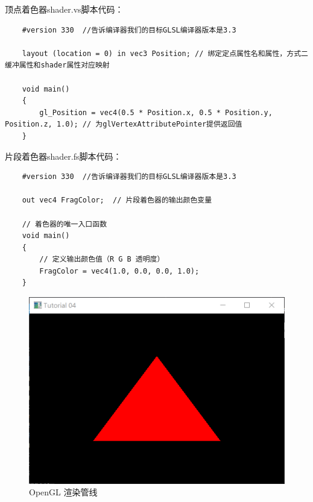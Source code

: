 \documentclass[UTF8,a4paper,8pt]{ctexbook}
\begin{document}
		顶点着色器shader.vs脚本代码：
		\begin{lstlisting}
	#version 330  //告诉编译器我们的目标GLSL编译器版本是3.3
	
	layout (location = 0) in vec3 Position; // 绑定定点属性名和属性，方式二缓冲属性和shader属性对应映射
	
	void main()
	{
		gl_Position = vec4(0.5 * Position.x, 0.5 * Position.y, Position.z, 1.0); // 为glVertexAttributePointer提供返回值
	}		
		\end{lstlisting}
		
		片段着色器shader.fs脚本代码：
		\begin{lstlisting}
	#version 330  //告诉编译器我们的目标GLSL编译器版本是3.3
	
	out vec4 FragColor;  // 片段着色器的输出颜色变量
	
	// 着色器的唯一入口函数
	void main()
	{
		// 定义输出颜色值（R G B 透明度）
		FragColor = vec4(1.0, 0.0, 0.0, 1.0);
	}	
		\end{lstlisting}
		
		\begin{figure}[h]
			\centering
			\includegraphics[scale = 0.4]{result.png}
			\caption{OpenGL 渲染管线}
		\end{figure}
		
\end{document}
